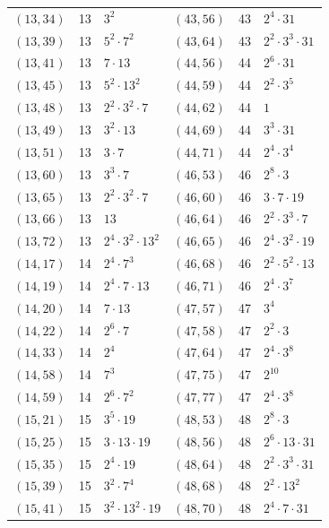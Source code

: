 \documentclass[11pt]{article}
\begin{document}
\begin{longtable}{@{}lrl@{\qquad}lrl@{}}
$(13,34)$ & 13 & $3^{2}$ & $(43,56)$ & 43 & $2^{4}\cdot 31$\\
$(13,39)$ & 13 & $5^{2}\cdot 7^{2}$ & $(43,64)$ & 43 & $2^{2}\cdot 3^{3}\cdot 31$\\
$(13,41)$ & 13 & $7\cdot 13$ & $(44,56)$ & 44 & $2^{6}\cdot 31$\\
$(13,45)$ & 13 & $5^{2}\cdot 13^{2}$ & $(44,59)$ & 44 & $2^{2}\cdot 3^{5}$\\
$(13,48)$ & 13 & $2^{2}\cdot 3^{2}\cdot 7$ & $(44,62)$ & 44 & $1$\\
$(13,49)$ & 13 & $3^{2}\cdot 13$ & $(44,69)$ & 44 & $3^{3}\cdot 31$\\
$(13,51)$ & 13 & $3\cdot 7$ & $(44,71)$ & 44 & $2^{4}\cdot 3^{4}$\\
$(13,60)$ & 13 & $3^{3}\cdot 7$ & $(46,53)$ & 46 & $2^{8}\cdot 3$\\
$(13,65)$ & 13 & $2^{2}\cdot 3^{2}\cdot 7$ & $(46,60)$ & 46 & $3\cdot 7\cdot 19$\\
$(13,66)$ & 13 & $13$ & $(46,64)$ & 46 & $2^{2}\cdot 3^{3}\cdot 7$\\
$(13,72)$ & 13 & $2^{4}\cdot 3^{2}\cdot 13^{2}$ & $(46,65)$ & 46 & $2^{4}\cdot 3^{2}\cdot 19$\\
$(14,17)$ & 14 & $2^{4}\cdot 7^{3}$ & $(46,68)$ & 46 & $2^{2}\cdot 5^{2}\cdot 13$\\
$(14,19)$ & 14 & $2^{4}\cdot 7\cdot 13$ & $(46,71)$ & 46 & $2^{4}\cdot 3^{7}$\\
$(14,20)$ & 14 & $7\cdot 13$ & $(47,57)$ & 47 & $3^{4}$\\
$(14,22)$ & 14 & $2^{6}\cdot 7$ & $(47,58)$ & 47 & $2^{2}\cdot 3$\\
$(14,33)$ & 14 & $2^{4}$ & $(47,64)$ & 47 & $2^{4}\cdot 3^{8}$\\
$(14,58)$ & 14 & $7^{3}$ & $(47,75)$ & 47 & $2^{10}$\\
$(14,59)$ & 14 & $2^{6}\cdot 7^{2}$ & $(47,77)$ & 47 & $2^{4}\cdot 3^{8}$\\
$(15,21)$ & 15 & $3^{5}\cdot 19$ & $(48,53)$ & 48 & $2^{8}\cdot 3$\\
$(15,25)$ & 15 & $3\cdot 13\cdot 19$ & $(48,56)$ & 48 & $2^{6}\cdot 13\cdot 31$\\
$(15,35)$ & 15 & $2^{4}\cdot 19$ & $(48,64)$ & 48 & $2^{2}\cdot 3^{3}\cdot 31$\\
$(15,39)$ & 15 & $3^{2}\cdot 7^{4}$ & $(48,68)$ & 48 & $2^{2}\cdot 13^{2}$\\
$(15,41)$ & 15 & $3^{2}\cdot 13^{2}\cdot 19$ & $(48,70)$ & 48 & $2^{4}\cdot 7\cdot 31$\\

\end{longtable}
\end{document}
